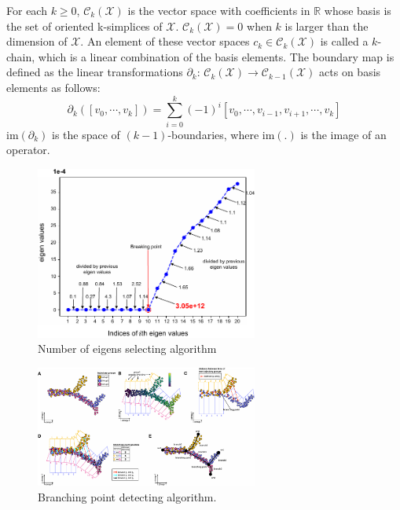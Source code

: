 For each $k \geq 0$, $\mathcal{C}_k(\mathcal{X})$ is the vector space with coefficients in $\mathbb{R}$ whose basis is the set of oriented k-simplices of $\mathcal{X}$. $\mathcal{C}_k(\mathcal{X}) = 0$ when $k$ is larger than the dimension of $\mathcal{X}$. An element of these vector spaces $c_k \in \mathcal{C}_k(\mathcal{X})$ is called a $k$-chain, which is a linear combination of the basis elements. The boundary map is defined as the linear transformations $\partial_{k}$: $\mathcal{C}_k(\mathcal{X}) \rightarrow \mathcal{C}_{k-1}(\mathcal{X})$ acts on basis elements as follows:
\begin{equation}
\partial_k ([v_0,\cdots, v_k]) = \sum_{i=0}^{k} (-1)^i [v_0, \cdots, v_{i-1}, v_{i+1}, \cdots, v_k]
\end{equation}
$\mathrm{im}(\partial_k)$ is the space of $(k-1)$-boundaries, where $\mathrm{im}(.)$ is the image of an operator. 


\begin{figure}[!ht]
	\centering
	\includegraphics[width=0.65\textwidth]{breakingpoint/fig}
	\vspace{0.1cm}
	\caption[Number of eigens selecting algorithm.]{Number of eigens selecting algorithm}
	\label{fig:breakingpoint}
\end{figure}


\begin{figure}[!ht]
    \centering
    \includegraphics[width=0.65\textwidth]{branching/fig}
    \vspace{0.1cm}
    \caption[Branching point detecting algorithm.]{Branching point detecting algorithm.}
    \label{fig:breakingpoint}
\end{figure}


